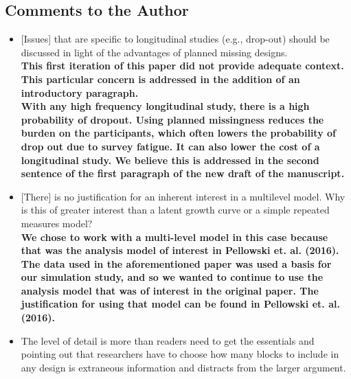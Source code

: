 \documentclass[letterpaper,12pt]{article}\usepackage[]{graphicx}\usepackage[]{color}
\begin{document}
\subsection{Comments to the Author}
\begin{itemize}

\item {[Issues]} that are specific to longitudinal studies (e.g., drop-out) should be discussed in light of the advantages of planned missing designs.\\

{\bf This first iteration of this paper did not provide adequate context. This particular concern is addressed in the addition of an introductory paragraph.}\\

{\bf With any high frequency longitudinal study, there is a high probability of dropout.  Using planned missingness reduces the burden on the participants, which often lowers the probability of drop out due to survey fatigue.  It can also lower the cost of a longitudinal study.  We believe this is addressed in the second sentence of the first paragraph of the new draft of the manuscript.}\\


\item {[There]} is no justification for an inherent interest in a multilevel model. Why is this of greater interest than a latent growth curve or a simple repeated measures model?\\

{\bf We chose to work with a multi-level model in this case because that was the analysis model of interest in Pellowski et. al. (2016).  The data used in the aforementioned paper was used a basis for our simulation study, and so we wanted to continue to use the analysis model that was of interest in the original paper.  The justification for using that model can be found in Pellowski et. al. (2016).  }\\

\item  The level of detail is more than readers need to get the essentials and pointing out that researchers have to choose how many blocks to include in any design is extraneous information and distracts from the larger argument.\\


\end{itemize}
\end{document}
